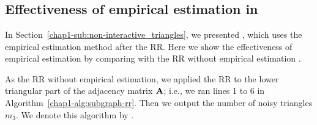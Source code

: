 \graphicspath{{./chapters/chapter1/}}
\chapter{ }




\section{Effectiveness of empirical estimation in }
\label{chap1-sec:RR_emp}
In Section~\ref{chap1-sub:non-interactive_triangles}, we presented , which uses the empirical estimation method after the RR. 
Here we show the effectiveness of empirical estimation by comparing  with the RR without empirical estimation \cite{Qin_CCS17,Ye_ICDE20}. 

As the RR without empirical estimation, we applied the RR to the lower triangular part of the adjacency matrix $\mathbf{A}$; i.e., we ran lines 1 to 6 in Algorithm~\ref{chap1-alg:subgraph-rr}. 
Then we output the number of noisy triangles $m_3$. 
We denote this algorithm by . 

